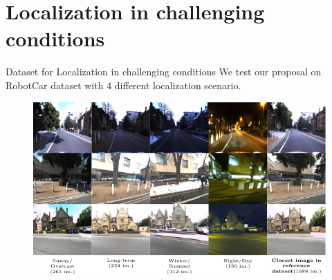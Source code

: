 \section{{\fontsize{20}{20}\selectfont Localization in challenging conditions}}

\label{sec:results}

\begin{frame}{Dataset for Localization in challenging conditions}
	We test our proposal on RobotCar dataset with 4 different localization scenario.
	\begin{figure}
		\includegraphics[width=0.7\linewidth]{vect/res/dataset}
	\end{figure}		
\end{frame}
%
%	
%
%	


